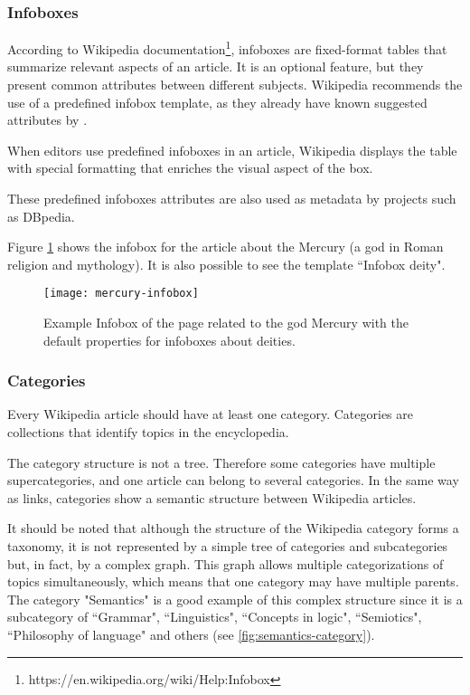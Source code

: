 \subsubsection{\hspace*{3pt} Infoboxes}

According to Wikipedia documentation\footnote{https://en.wikipedia.org/wiki/Help:Infobox}, infoboxes are fixed-format tables that summarize relevant aspects of an article. It is an optional feature, but they present common attributes between different subjects. Wikipedia recommends the use of a predefined infobox template, as they already have known suggested attributes by 
. 

When editors use predefined infoboxes in an article, Wikipedia displays the table with special formatting that enriches the visual aspect of the box. 

These predefined infoboxes attributes are also used as metadata by projects such as DBpedia. 

Figure \ref{fig:mercury-infobox} shows the infobox for the article about the Mercury (a god in Roman religion and mythology). It is also possible to see the template ``Infobox deity". 



\begin{figure}[!h]
\centering
  \texttt{[image: mercury-infobox]}
  \caption{Example Infobox of the page related to the god Mercury with the default properties for infoboxes about deities.}
  \label{fig:mercury-infobox}
\end{figure}



\subsubsection{\hspace*{3pt} Categories}

Every Wikipedia article should have at least one category. Categories are collections that identify topics in the encyclopedia. 

The category structure is not a tree. Therefore some categories have multiple supercategories, and one article can belong to several categories. In the same way as links, categories show a semantic structure between Wikipedia articles. 

It should be noted that although the structure of the Wikipedia category forms a taxonomy, it is not represented by a simple tree of categories and subcategories but, in fact, by a complex graph. This graph allows multiple categorizations of topics simultaneously, which means that one category may have multiple parents. The category "Semantics" is a good example of this complex structure since it is a subcategory of ``Grammar",  ``Linguistics", ``Concepts in logic", ``Semiotics", ``Philosophy of language" and others (see \ref{fig:semantics-category}).


